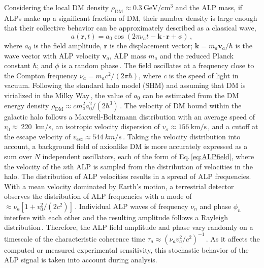 \documentclass[superscriptaddress,
floatfix,
reprint,
nofootinbib,
amsmath,amssymb,
aps,
prd,
]{revtex4-2}
\begin{document}
Considering the local DM density $\rho_{\text{DM}} \approx \SI{0.3}{\GeV/\cm^{3}}$ \cite{BERGSTROM1998137, Jungman1992SupersymmetricDM, Sofue_Rubin_2001_RotationCurves} and the ALP mass, if ALPs make up a significant fraction of DM, their number density is large enough that their collective behavior can be approximately described as a classical wave, 
\begin{equation}\label{eq:ALPfield}
    a(\mathbf{r},t) = a_0 \cos{(2\pi\nu_a t - \mathbf{k}\cdot\mathbf{r}+\phi)}\,,
\end{equation}
where $a_{0}$ is the field amplitude, $\mathbf{r}$ is the displacement vector; $\mathbf{k}=m_a\bm{v}_a/\hbar$ is the wave vector with ALP velocity $\bm{v}_a$, ALP mass $m_a$ and the reduced Planck constant $\hbar$; and $\phi$ is a random phase\,\cite{Foster2018HaloAxion,Lisanti2021Stoch,Cheong2025QuantumDM}.
The field oscillates at a frequency close to the Compton frequency $\nu_{a}= m_{a}c^2/(2\pi\hbar)$, where $c$ is the speed of light in vacuum.
Following the standard halo model (SHM) and assuming that DM is virialized in the Milky Way\,\cite{Primack1988DetectionOC}, the value of $a_0$ can be estimated from the DM energy density $\rho_{\text{DM}}\approx{c m_a^2 a_0^2}/{(2\hbar^3)}$\,\cite{kimball2018overview}. 
The velocity of DM bound within the galactic halo follows a Maxwell-Boltzmann distribution with an average speed of $v_0\approx$\,\SI{220}{km/s}, an isotropic velocity dispersion of $v_\sigma \approx \SI{156}{\km/\s}$\,\cite{Primack1988DetectionOC}, and a cutoff at the escape velocity of $v_\mathrm{esc}\approx\SI{544}{km/s}$\,\cite{Evans2019_SHMRefined}.
Taking the velocity distribution into account, a background field of axionlike DM is more accurately expressed as a sum over $N$ independent oscillators, each of the form of Eq.\,\eqref{eq:ALPfield}, where the velocity of the $n$th ALP is sampled from the distribution of velocities in the halo.
The distribution of ALP velocities results in a spread of ALP frequencies. 
With a mean velocity dominated by Earth's motion, a terrestrial detector observes the distribution of ALP frequencies with a mode of $\approx \nu_a[1+v_0^2/(2c^2)]$\,\cite{kimball2018overview}. 
Individual ALP waves of frequency $\nu_n$ and phase $\phi_n$ interfere with each other and the resulting amplitude follows a Rayleigh distribution\,\cite{Foster2018HaloAxion, Lisanti2021Stoch, Gramolin2022Feb_SpectralSignatures}.
Therefore, the ALP field amplitude and phase vary randomly on a timescale of the characteristic coherence time $\tau_a \approx (\nu_a v_a^2 / c^2)^{-1}$\,\cite{Schive2014,  Centers2021Stochastic, Gramolin2022Feb_SpectralSignatures}.
As it affects the computed or measured experimental sensitivity, this stochastic behavior of the ALP signal is taken into account during analysis. 
\end{document}
